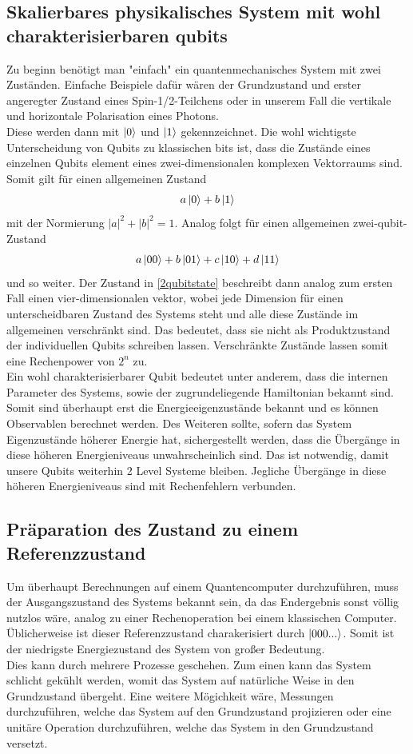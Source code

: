 \documentclass[11pt]{article}
\begin{document}
\subsection{Skalierbares physikalisches System mit wohl charakterisierbaren qubits}
Zu beginn benötigt man "einfach" ein quantenmechanisches System mit zwei Zuständen. Einfache Beispiele dafür wären der
Grundzustand und erster angeregter Zustand eines Spin-1/2-Teilchens oder in unserem Fall die vertikale und horizontale
Polarisation eines Photons.\\
Diese werden dann mit $\ket{0}$ und $\ket{1}$ gekennzeichnet. Die wohl wichtigste Unterscheidung von Qubits zu klassischen bits
ist, dass die Zustände eines einzelnen Qubits element eines zwei-dimensionalen komplexen Vektorraums sind. Somit gilt für
einen allgemeinen Zustand
\begin{align}
    a\ket{0} + b\ket{1}
\end{align} 
mit der Normierung $|a|^2+|b|^2 = 1$. Analog folgt für einen allgemeinen zwei-qubit-Zustand
\begin{align}
    a\ket{00} + b\ket{01} + c\ket{10} + d\ket{11}  
    \label{2qubitstate}
\end{align}
und so weiter. Der Zustand in \eqref{2qubitstate} beschreibt dann analog zum ersten Fall einen vier-dimensionalen vektor, wobei
jede Dimension für einen unterscheidbaren Zustand des Systems steht und alle diese Zustände im allgemeinen verschränkt sind.
Das bedeutet, dass sie nicht als Produktzustand der individuellen Qubits schreiben lassen. Verschränkte Zustände lassen somit
eine Rechenpower von $2^n$ zu.\\
Ein wohl charakterisierbarer Qubit bedeutet unter anderem, dass die internen Parameter des Systems, sowie der zugrundeliegende
Hamiltonian bekannt sind. Somit sind überhaupt erst die Energieeigenzustände bekannt und es können Observablen berechnet werden.
Des Weiteren sollte, sofern das System Eigenzustände höherer Energie hat, sichergestellt werden, dass die Übergänge in diese
höheren Energieniveaus unwahrscheinlich sind. Das ist notwendig, damit unsere Qubits weiterhin 2 Level Systeme bleiben. 
Jegliche Übergänge in diese höheren Energieniveaus sind mit Rechenfehlern verbunden.\\
\subsection{Präparation des Zustand zu einem Referenzzustand}
Um überhaupt Berechnungen auf einem Quantencomputer durchzuführen, muss der Ausgangszustand des Systems bekannt sein, da 
das Endergebnis sonst völlig nutzlos wäre, analog zu einer Rechenoperation bei einem klassischen Computer. Üblicherweise ist
dieser Referenzzustand charakerisiert durch $\ket{000...}$. Somit ist der niedrigste Energiezustand des System von großer 
Bedeutung.\\
Dies kann durch mehrere Prozesse geschehen. Zum einen kann das System schlicht gekühlt werden, womit das System auf natürliche
Weise in den Grundzustand übergeht. Eine weitere Mögichkeit wäre, Messungen durchzuführen, welche das System auf den Grundzustand
projizieren oder eine unitäre Operation durchzuführen, welche das System in den Grundzustand versetzt.\\
\end{document}
